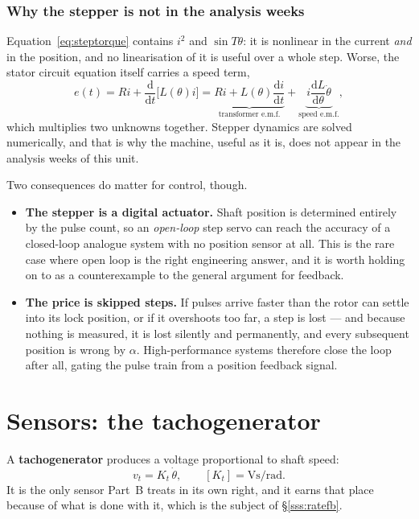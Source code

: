 \documentclass[11pt,a4paper]{article}
\begin{document}
\subsubsection{Why the stepper is not in the analysis weeks}

Equation~\eqref{eq:steptorque} contains $i^{2}$ and $\sin T\theta$: it is
nonlinear in the current \emph{and} in the position, and no linearisation of it
is useful over a whole step. Worse, the stator circuit equation itself carries
a speed term,
\[
  e(t)=Ri+\frac{\mathrm{d}}{\mathrm{d}t}\big[L(\theta)i\big]
      =\underbrace{Ri+L(\theta)\frac{\mathrm{d}i}{\mathrm{d}t}}_{\text{transformer e.m.f.}}
       +\underbrace{i\frac{\mathrm{d}L}{\mathrm{d}\theta}\dot\theta}_{\text{speed e.m.f.}},
\]
which multiplies two unknowns together. Stepper dynamics are solved
numerically, and that is why the machine, useful as it is, does not appear in
the analysis weeks of this unit.

Two consequences do matter for control, though.

\begin{itemize}[leftmargin=1.5em,itemsep=2pt]
\item \textbf{The stepper is a digital actuator.} Shaft position is determined
      entirely by the pulse count, so an \emph{open-loop} step servo can reach
      the accuracy of a closed-loop analogue system with no position sensor at
      all. This is the rare case where open loop is the right engineering
      answer, and it is worth holding on to as a counterexample to the general
      argument for feedback.
\item \textbf{The price is skipped steps.} If pulses arrive faster than the
      rotor can settle into its lock position, or if it overshoots too far,
      a step is lost --- and because nothing is measured, it is lost silently
      and permanently, and every subsequent position is wrong by $\alpha$.
      High-performance systems therefore close the loop after all, gating the
      pulse train from a position feedback signal.
\end{itemize}

\section{Sensors: the tachogenerator}
\label{sec:tacho}

A \textbf{tachogenerator} produces a voltage proportional to shaft speed:
\begin{equation}
  v_{t}=K_{t}\,\dot\theta,
  \qquad [K_{t}]=\si{\volt\second\per\radian}.
  \label{eq:tacho}
\end{equation}
It is the only sensor Part~B treats in its own right, and it earns that place
because of what is done with it, which is the subject of \S\ref{sss:ratefb}.
\end{document}
